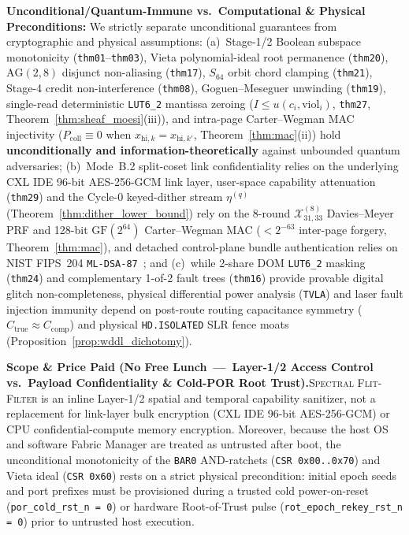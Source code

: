 \documentclass[10pt,twocolumn]{article}
\theoremstyle{spectralthm}
\begin{document}
\noindent\textbf{Unconditional/Quantum-Immune vs.\ Computational \& Physical Preconditions:}
We strictly separate unconditional guarantees from cryptographic and physical assumptions: (a)~Stage-1/2 Boolean subspace monotonicity (\texttt{thm01}--\texttt{thm03}), Vieta polynomial-ideal root permanence (\texttt{thm20}), $\mathrm{AG}(2,8)$ disjunct non-aliasing (\texttt{thm17}), $S_{64}$ orbit chord clamping (\texttt{thm21}), Stage-4 credit non-interference (\texttt{thm08}), Goguen--Meseguer unwinding (\texttt{thm19}), single-read deterministic \mbox{\texttt{LUT6\_2}} mantissa zeroing ($I \le u(c_i,\mathrm{viol}_i)$, \texttt{thm27}, Theorem~\ref{thm:sheaf_moesi}(iii)), and intra-page Carter--Wegman MAC injectivity ($P_{\mathrm{coll}} \equiv 0$ when $x_{\mathrm{hi},k} = x_{\mathrm{hi},k'}$, Theorem~\ref{thm:mac}(ii)) hold \textbf{unconditionally and information-theoretically} against unbounded quantum adversaries; (b)~Mode~B.2 split-coset link confidentiality relies on the underlying CXL IDE 96-bit AES-256-GCM link layer, user-space capability attenuation (\texttt{thm29}) and the Cycle-0 keyed-dither stream $\eta^{(q)}$ (Theorem~\ref{thm:dither_lower_bound}) rely on the 8-round $\mathcal{X}_{31,33}^{(8)}$ Davies--Meyer PRF and 128-bit $\mathrm{GF}(2^{64})$ Carter--Wegman MAC ($<2^{-63}$ inter-page forgery, Theorem~\ref{thm:mac}), and detached control-plane bundle authentication relies on NIST FIPS~204 \texttt{ML-DSA-87}~\cite{fips204mldsa}; and (c)~while 2-share DOM \mbox{\texttt{LUT6\_2}} masking (\texttt{thm24}) and complementary 1-of-2 fault trees (\texttt{thm16}) provide provable digital glitch non-completeness, physical differential power analysis (\texttt{TVLA}) and laser fault injection immunity depend on post-route routing capacitance symmetry ($C_{\mathrm{true}} \approx C_{\mathrm{comp}}$) and physical \texttt{HD.ISOLATED} SLR fence moats (Proposition~\ref{prop:wddl_dichotomy}).

\par\medskip\noindent\textbf{Scope \& Price Paid (No Free Lunch~---~Layer-1/2 Access Control vs.\ Payload Confidentiality \& Cold-POR Root Trust).}\;\textsc{Spectral Flit-Filter} is an inline Layer-1/2 spatial and temporal capability sanitizer, not a replacement for link-layer bulk encryption (CXL IDE 96-bit AES-256-GCM) or CPU confidential-compute memory encryption. Moreover, because the host OS and software Fabric Manager are treated as untrusted after boot, the unconditional monotonicity of the \texttt{BAR0} AND-ratchets (\texttt{CSR 0x00..0x70}) and Vieta ideal (\texttt{CSR 0x60}) rests on a strict physical precondition: initial epoch seeds and port prefixes must be provisioned during a trusted cold power-on-reset (\texttt{por\_cold\_rst\_n = 0}) or hardware Root-of-Trust pulse (\texttt{rot\_epoch\_rekey\_rst\_n = 0}) prior to untrusted host execution.
\end{document}
